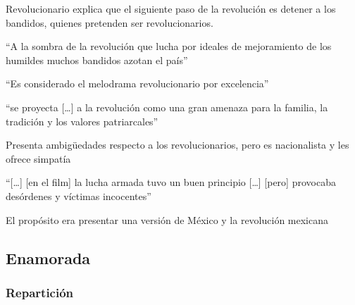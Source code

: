 \begin{compactitem}
    \item Revolucionario explica que el siguiente paso de la revolución es detener a los bandidos, quienes pretenden ser revolucionarios.\autocite[48:07-48:40]{fernandez_flor_1943}
    \item ``A la sombra de la revolución que lucha por ideales de mejoramiento de los humildes muchos bandidos azotan el país''\autocite[1:21:40]{fernandez_flor_1943}
    \item ``Es considerado el melodrama revolucionario por excelencia''\autocite[178]{guerrero_imagen_2005}
    \item ``se proyecta [\ldots] a la revolución como una gran amenaza para la familia, la tradición y los valores patriarcales''\autocite[178]{guerrero_imagen_2005}
    \item Presenta ambigüedades respecto a los revolucionarios, pero es nacionalista y les ofrece simpatía\autocite[87]{demello_unfinished_2001}
    \item ``[\ldots] [en el film] la lucha armada tuvo un buen principio [\ldots] [pero] provocaba desórdenes y víctimas incocentes''\autocite[36]{blanco_aventura_1993}
    \item El propósito era presentar una versión de México y la revolución mexicana\autocite[23:19]{soler_serrano_emilio_1976}
    \end{compactitem} 

\subsection{Enamorada}
\subsubsection{Repartición}
